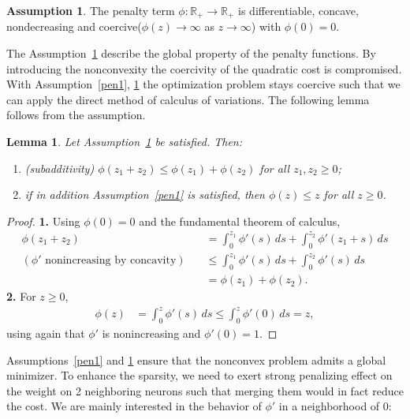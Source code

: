 \documentclass[11pt]{amsart}
\newtheorem{lemma}[theorem]{Lemma}
\theoremstyle{definition}
\newtheorem{assumption}[theorem]{Assumption}
\theoremstyle{remark}
\begin{document}
\begin{assumption} \label{pen2}
The penalty term $\phi: \mathbb{R}_+ \rightarrow \mathbb{R}_+$ is differentiable, concave, nondecreasing and coercive($\phi(z) \rightarrow \infty$ as $z \rightarrow \infty$) with $\phi(0) = 0$.
\end{assumption}
 
The Assumption~\ref{pen2} describe the global property of the penalty functions. 
By introducing the nonconvexity the coercivity of the quadratic cost is compromised. 
With Assumption~\ref{pen1}, \ref{pen2} the optimization problem stays coercive such that we can apply the direct method of calculus of variations. 
The following lemma follows from the assumption. 
 
\begin{lemma} \label{firstorderestimate} Let Assumption~\ref{pen2} be satisfied. Then:
\begin{enumerate}
	\item (subadditivity) $\phi(z_1 + z_2) \le \phi(z_1) + \phi(z_2)$ for all $z_1, z_2 \ge 0$;
	\item if in addition Assumption~\ref{pen1} is satisfied, then $\phi(z) \le z$ for all $z \ge 0$.
\end{enumerate}
\end{lemma}
\begin{proof}
	\textbf{1.}  Using $\phi(0) = 0$ and the fundamental theorem of calculus,
	\begin{align*}
		\phi(z_1 + z_2) &= \int_0^{z_1} \phi'(s)\, ds + \int_0^{z_2} \phi'(z_1 + s)\, ds \\
(\phi' \text{ nonincreasing by concavity})\quad		&\le  \int_0^{z_1} \phi'(s)\, ds + \int_0^{z_2} \phi'(s)\, ds \\
		& = \phi(z_1) + \phi(z_2).
	\end{align*}
	\textbf{2.} For $z \ge 0$,
	\begin{align*}
		\phi(z) &= \int_0^{z} \phi'(s)\, ds
		 \le \int_0^{z} \phi'(0)\, ds
		 = z,
	\end{align*}
	using again that $\phi'$ is nonincreasing and $\phi'(0) = 1$.
\end{proof}
 
 
Assumptions~\ref{pen1} and \ref{pen2} ensure that the nonconvex problem admits a global minimizer. 
To enhance the sparsity, we need to exert strong penalizing effect on the weight on 2 neighboring neurons such that merging them would in fact reduce the cost. 
We are mainly interested in the behavior of $\phi'$ in a neighborhood of $0$: 
 
\end{document}
